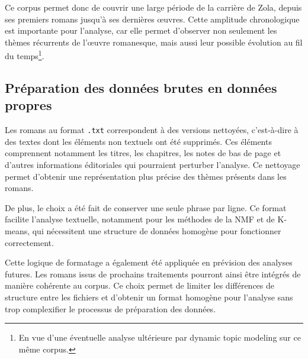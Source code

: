 Ce corpus permet donc de couvrir une large période de la carrière de Zola, depuis ses premiers romans jusqu'à ses dernières œuvres. Cette amplitude chronologique est importante pour l'analyse, car elle permet d'observer non seulement les thèmes récurrents de l'œuvre romanesque, mais aussi leur possible évolution au fil du temps\footnote{En vue d'une éventuelle analyse ultérieure par dynamic topic modeling sur ce même corpus.}.


\subsection{Préparation des données brutes en données propres}

Les romans au format \texttt{.txt} correspondent à des versions nettoyées, c'est-à-dire à des textes dont les éléments non textuels ont été supprimés. Ces éléments comprennent notamment les titres, les chapitres, les notes de bas de page et d'autres informations éditoriales qui pourraient perturber l'analyse. Ce nettoyage permet d'obtenir une représentation plus précise des thèmes présents dans les romans.

De plus, le choix a été fait de conserver une seule phrase par ligne. Ce format facilite l'analyse textuelle, notamment pour les méthodes de la NMF et de K-means, qui nécessitent une structure de données homogène pour fonctionner correctement.

Cette logique de formatage a également été appliquée en prévision des analyses futures. Les romans issus de prochains traitements pourront ainsi être intégrés de manière cohérente au corpus. Ce choix permet de limiter les différences de structure entre les fichiers et d'obtenir un format homogène pour l'analyse sans trop complexifier le processus de préparation des données.

